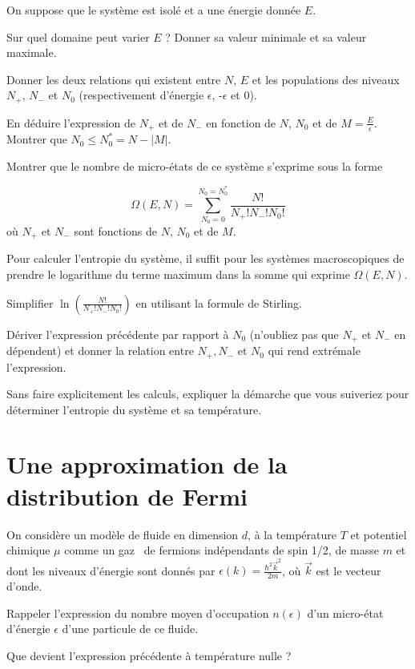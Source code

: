 \documentclass[utf8, 11pt]{feuille}
\begin{document}
On suppose que le système est isolé et a une énergie donnée $E$.

\question Sur quel domaine peut varier $E$ ? Donner sa valeur minimale et sa valeur maximale.

\question Donner les deux relations qui existent entre $N$, $E$ et les populations des niveaux $N_{+}$, $N_{-}$ et $N_{0}$ (respectivement d'énergie $\epsilon$, -$\epsilon$ et 0).

\question En déduire l'expression de $N_{+}$ et de $N_{-}$ en fonction de $N$, $N_{0}$ et de $M=\frac{E}{\epsilon}$. Montrer que $N_0 \le N_0^*=N-|M|$.

\question Montrer que le nombre de micro-états de ce système s'exprime sous la forme

$$
\Omega(E,N)=\sum_{N_0=0}^{N_0=N_0^*} \frac{N!}{N_{+}!N_{-}!N_0!}
$$
où $N_{+}$ et $N_{-}$ sont fonctions de $N$, $N_{0}$ et de $M$.


Pour calculer l'entropie du système, il suffit pour les systèmes macroscopiques de prendre le logarithme du terme maximum dans la somme qui exprime $\Omega(E,N)$.

\question Simplifier $\ln (\frac{N!}{N_{+}!N_{-}!N_0!} )$ en utilisant la formule de Stirling.

\question Dériver l'expression précédente par rapport à $N_0$ (n'oubliez pas que $N_{+}$ et $N_{-}$ en dépendent) et donner la relation entre $N_{+}, N_{-}$ et $N_0$ qui rend extrémale l'expression.

\question Sans faire explicitement les calculs, expliquer la démarche que vous suiveriez pour déterminer l'entropie du système et sa température. 

\section{Une approximation de la distribution de Fermi}

On considère un modèle de fluide en dimension $d$, à la température $T$ et potentiel chimique $\mu$ comme un \og gaz \fg \ de fermions  indépendants de spin 1/2, de masse $m$ et dont les niveaux d'énergie  sont donnés par
$\epsilon (k)=\frac{\hbar^2 \vec{k}^2}{2m}$,
où $\vec k$ est le vecteur d'onde.

\question Rappeler l'expression du nombre moyen d'occupation $n(\epsilon)$ d'un micro-état d'énergie $\epsilon$ d'une particule de ce fluide.

\question Que devient l'expression précédente à température nulle ?
\end{document}
